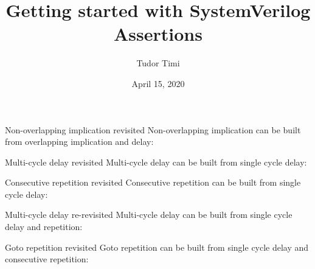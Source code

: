 \documentclass{beamer}
\title{Getting started with SystemVerilog Assertions}
\author{Tudor Timi}
\institute{VerificationGentleman.com}
\date{April 15, 2020}
\begin{document}
\begin{frame}[fragile]{Non-overlapping implication revisited}
Non-overlapping implication can be built from overlapping implication and delay:

\pause
{}

\pause
{}

\pause
{}
\end{frame}


\begin{frame}[fragile]{Multi-cycle delay revisited}
Multi-cycle delay can be built from single cycle delay:

\pause
{}
\end{frame}


\begin{frame}[fragile]{Consecutive repetition revisited}
Consecutive repetition can be built from single cycle delay:

\pause
{}
\end{frame}


\begin{frame}[fragile]{Multi-cycle delay re-revisited}
Multi-cycle delay can be built from single cycle delay and repetition:

\pause
{}

\pause
{}
\end{frame}


\begin{frame}[fragile]{Goto repetition revisited}
Goto repetition can be built from single cycle delay and consecutive repetition:

\pause
{}

\pause
{}
\end{frame}
\end{document}
